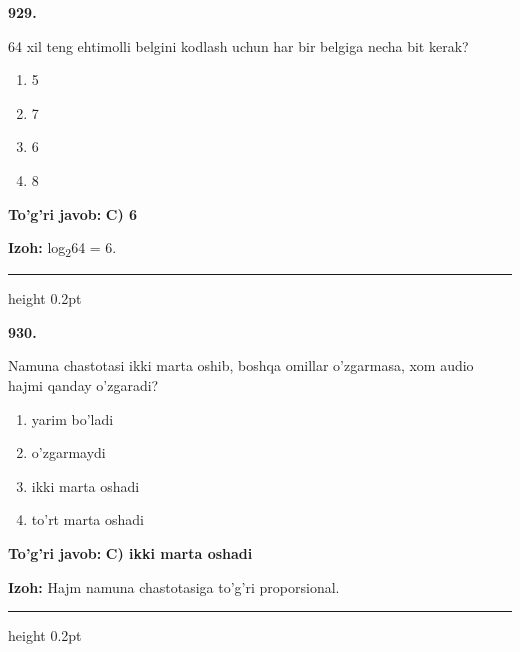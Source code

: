 \documentclass[10pt,a4paper,oneside]{article}
\begin{document}
\noindent\textbf{\color{ink}929.}
\par
64 xil teng ehtimolli belgini kodlash uchun har bir belgiga necha bit kerak?
\begin{enumerate}[label=\Alph*),leftmargin=9mm]
\item 5
\item 7
\item 6
\item 8
\end{enumerate}
\begin{tcolorbox}[enhanced,breakable,colback=teal!4,colframe=teal!50!black,boxrule=0.5pt,arc=1.1mm,left=3mm,right=3mm,top=1.7mm,bottom=1.7mm,before skip=2mm,after skip=2mm]
\textbf{\color{teal}To'g'ri javob:} \textbf{C) 6}
\par\smallskip
\textbf{Izoh:} log\textsubscript{2}64 = 6.
\end{tcolorbox}
\vspace{2mm}\hrule height 0.2pt \vspace{3mm}

\noindent\textbf{\color{ink}930.}
\par
Namuna chastotasi ikki marta oshib, boshqa omillar o'zgarmasa, xom audio hajmi qanday o'zgaradi?
\begin{enumerate}[label=\Alph*),leftmargin=9mm]
\item yarim bo'ladi
\item o'zgarmaydi
\item ikki marta oshadi
\item to'rt marta oshadi
\end{enumerate}
\begin{tcolorbox}[enhanced,breakable,colback=teal!4,colframe=teal!50!black,boxrule=0.5pt,arc=1.1mm,left=3mm,right=3mm,top=1.7mm,bottom=1.7mm,before skip=2mm,after skip=2mm]
\textbf{\color{teal}To'g'ri javob:} \textbf{C) ikki marta oshadi}
\par\smallskip
\textbf{Izoh:} Hajm namuna chastotasiga to'g'ri proporsional.
\end{tcolorbox}
\vspace{2mm}\hrule height 0.2pt \vspace{3mm}
\end{document}
